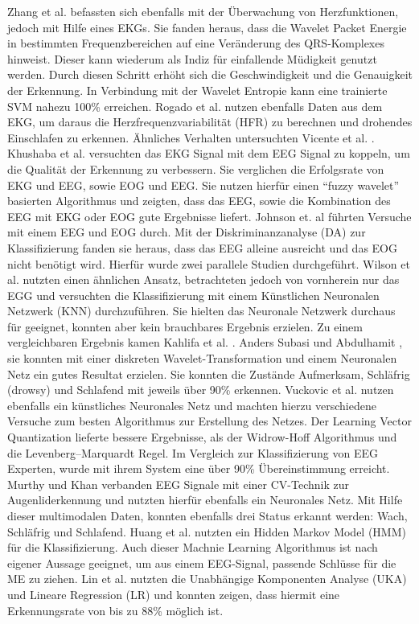 {Zhang et al. \cite{zhang_6513058} befassten sich ebenfalls mit der Überwachung von Herzfunktionen, jedoch mit Hilfe eines EKGs. Sie fanden heraus, dass die Wavelet Packet Energie in bestimmten Frequenzbereichen auf eine Veränderung des QRS-Komplexes hinweist. Dieser kann wiederum als Indiz für einfallende Müdigkeit genutzt werden. Durch diesen Schritt erhöht sich  die Geschwindigkeit und die Genauigkeit der Erkennung. In Verbindung mit der Wavelet Entropie kann eine trainierte SVM nahezu 100\% erreichen. Rogado et al. \cite{Rogado_4913155} nutzen ebenfalls Daten aus dem EKG, um daraus die Herzfrequenzvariabilität (HFR) zu berechnen und drohendes Einschlafen zu erkennen. Ähnliches Verhalten untersuchten Vicente et al. \cite{Vicente_6164509}. \\

Khushaba et al. \cite{Khushaba_5580017} versuchten das EKG Signal mit dem EEG Signal zu koppeln, um die Qualität der Erkennung zu verbessern. Sie verglichen die Erfolgsrate von EKG und EEG, sowie EOG und EEG. Sie nutzen hierfür einen "`fuzzy wavelet"' basierten Algorithmus und zeigten, dass das EEG, sowie die Kombination des EEG mit EKG oder EOG gute Ergebnisse liefert. Johnson et. al \cite{Johnson11} führten Versuche mit einem EEG und EOG durch. Mit der Diskriminanzanalyse (DA) zur Klassifizierung fanden sie heraus, dass das EEG alleine ausreicht und das EOG nicht benötigt wird. Hierfür wurde zwei parallele Studien durchgeführt. Wilson et al. \cite{wilson_890161} nutzten einen ähnlichen Ansatz, betrachteten jedoch von vornherein nur das EGG und versuchten die Klassifizierung mit einem Künstlichen Neuronalen Netzwerk (KNN) durchzuführen. Sie hielten das Neuronale Netzwerk durchaus für geeignet, konnten aber kein brauchbares Ergebnis erzielen. Zu einem vergleichbaren Ergebnis kamen Kahlifa et al. \cite{khalifa_893852}. Anders Subasi und Abdulhamit \cite{Subasi:2005:ARA:1707423.1707550}, sie konnten mit einer diskreten Wavelet-Transformation und einem Neuronalen Netz ein gutes Resultat erzielen. Sie konnten die Zustände Aufmerksam, Schläfrig (drowsy) und Schlafend mit jeweils über 90\% erkennen. Vuckovic et al. \cite{Vuckovic2002349} nutzen ebenfalls ein künstliches Neuronales Netz und machten hierzu verschiedene Versuche zum besten Algorithmus zur Erstellung des Netzes. Der Learning Vector Quantization lieferte bessere Ergebnisse, als der Widrow-Hoff Algorithmus und die Levenberg–Marquardt Regel. Im Vergleich zur Klassifizierung von EEG Experten, wurde mit ihrem System  eine über 90\% Übereinstimmung erreicht. Murthy und Khan \cite{Murthy_1} verbanden EEG Signale mit einer CV-Technik zur Augenliderkennung und nutzten hierfür ebenfalls ein Neuronales Netz. Mit Hilfe dieser multimodalen Daten, konnten ebenfalls drei Status erkannt werden: Wach, Schläfrig und Schlafend.
Huang et al. \cite{Huang_548971} nutzten ein Hidden Markov Model (HMM) für die Klassifizierung. Auch dieser Machnie Learning Algorithmus ist nach eigener Aussage geeignet, um aus einem EEG-Signal, passende Schlüsse für die \acl{ME} zu ziehen. Lin et al. \cite{Lin05eeg-baseddrowsiness} nutzten die Unabhängige Komponenten Analyse (UKA) und Lineare Regression (LR) und konnten zeigen, dass hiermit eine Erkennungsrate von bis zu 88\% möglich ist.\\

}
